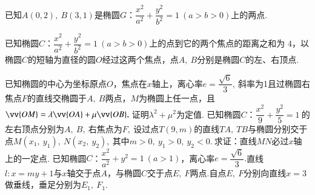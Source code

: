 \documentclass[marginline,noindent,answers,adobefonts]{BHCexam}
\begin{document}
\begin{questions}
\kongbai
\qs 已知$ A(0,2),~B(3,1) $是椭圆$G$：$\dfrac{x^2}{a^2}+\dfrac{y^2}{b^2}=1~(a>b>0)$上的两点.
\kongbai
\qs 已知椭圆$C$：$\dfrac{x^2}{a^2}+\dfrac{y^2}{b^2}=1~(a>b>0)$上的点到它的两个焦点的距离之和为 $ 4 $，以椭圆$ C $的短轴为直径的圆$ O $经过这两个焦点，点$ A,~B $分别是椭圆$ C $的左、右顶点.
\kongbai
\qs 已知椭圆的中心为坐标原点$ O $，焦点在$x$轴上，离心率$ e=\dfrac{\sqrt{6}}{3},~ $斜率为1且过椭圆右焦点$ F $的直线交椭圆于$ A,~B $两点，$ M $为椭圆上任一点，且$ \vv{OM}=\lambda\vv{OA}+\mu \vv{OB},~ $证明$ \lambda^2+\mu^2 $为定值.
\kongbai
\qs 已知椭圆$C$：$\dfrac{x^2}{9}+\dfrac{y^2}{5}=1~$的左右顶点分别为$ A,~B,~$右焦点为$ F ,~$设过点$ T(9,m) $的直线$ TA,~TB $与椭圆分别交于点$ M(x_1,~y_1),~N(x_2,~y_2) ,~$其中$ m>0,~y_1>0,~y_2<0.~ $求证：直线$ MN  $必过$x$轴上的一定点.
\newpage
\qs 已知椭圆$C$：$\dfrac{x^2}{a^2}+y^2=1~(a>1)$，离心率$ e=\dfrac{\sqrt{6}}{3}. $直线$ l:x=my+1 $与$x$轴交于点$ A $，与椭圆$ C $交于点$ E,~F $两点.自点$ E,~F $分别向直线$ x=3 $做垂线，垂足分别为$ E_1,~F_1. $
\begin{parts}

\end{parts}
\end{questions}
\end{document}
